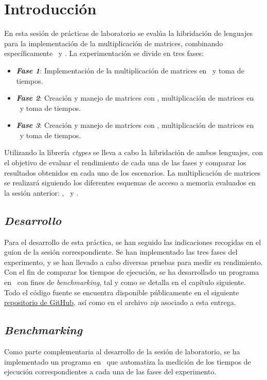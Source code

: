 \pagestyle{fancy}
\fancyhead[l]{\autorUO}
\fancyfoot[l]{\asignaturaAbbr}
\fancyfoot[r]{\fecha}

\section{Introducción} \label{sec:1}
En esta sesión de prácticas de laboratorio se evalúa la hibridación de lenguajes para la implementación de la multiplicación de matrices, 
combinando específicamente \C\ y \python. La experimentación se divide en tres fases:
\vspace{0.15cm}
\begin{itemize}
    \item \textit{\textbf{Fase 1}}: Implementación de la multiplicación de matrices en \python\ y toma de tiempos.
    \item \textit{\textbf{Fase 2}}: Creación y manejo de matrices con \python, multiplicación de matrices en \C\ y toma de tiempos.
    \item \textit{\textbf{Fase 3}}: Creación y manejo de matrices con \C, multiplicación de matrices en \C\ y toma de tiempos.
\end{itemize}
\vspace{0.15cm}
Utilizando la librería \textit{ctypes} se lleva a cabo la hibridación de ambos lenguajes, con el objetivo de evaluar el rendimiento de 
cada una de las fases y comparar los resultados obtenidos en cada uno de los escenarios. La multiplicación de matrices se realizará 
siguiendo los diferentes esquemas de acceso a memoria evaluados en la sesión anterior: \rowmajor, \colmajor\ y \zorder.

\subsection{\textit{Desarrollo}}
Para el desarrollo de esta práctica, se han seguido las indicaciones recogidas en el guion de la sesión correspondiente. 
Se han implementado las tres fases del experimento, y se han llevado a cabo diversas pruebas para medir su rendimiento.
Con el fin de comparar los tiempos de ejecución, se ha desarrollado un programa en \python\ con fines de \textit{benchmarking}, 
tal y como se detalla en el capítulo siguiente. Todo el código fuente se encuentra disponible públicamente en el siguiente 
\href{https://github.com/rubennmg/CAP/tree/main/sesion2}{repositorio de GitHub}, así como en el archivo \textit{zip} asociado a esta entrega.
\subsection{\textit{Benchmarking}}
Como parte complementaria al desarrollo de la sesión de laboratorio, se ha implementado un programa en \python\ que automatiza la medición de 
los tiempos de ejecución correspondientes a cada una de las fases del experimento.

